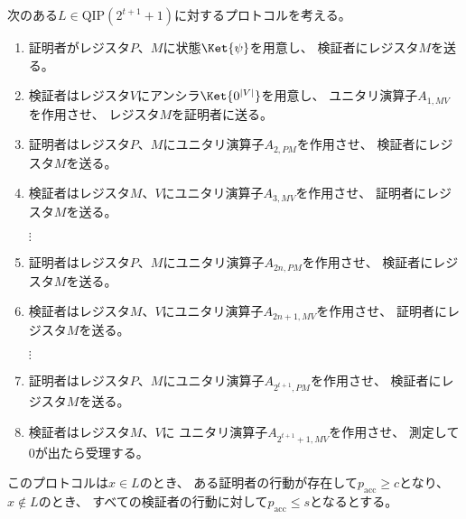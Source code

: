 \documentclass[a4paper, 10pt]{jsarticle}
\begin{document}
次のある$L \in \mathrm{QIP}(2^{t+1} + 1)$に対するプロトコルを考える。
\begin{enumerate}
	\item 証明者がレジスタ$P$、$M$に状態$\Ket{\psi}$を用意し、
	検証者にレジスタ$M$を送る。
	\item 検証者はレジスタ$V$にアンシラ$\Ket{0^{|V|}}$を用意し、
	ユニタリ演算子$A_{1, MV}$を作用させ、
	レジスタ$M$を証明者に送る。
	\item 証明者はレジスタ$P$、$M$にユニタリ演算子$A_{2, PM}$を作用させ、
	検証者にレジスタ$M$を送る。
	\item 検証者はレジスタ$M$、$V$にユニタリ演算子$A_{3, MV}$を作用させ、
	証明者にレジスタ$M$を送る。

	\begin{center}
		$\vdots$
	\end{center}

	\item 証明者はレジスタ$P$、$M$にユニタリ演算子$A_{2n, PM}$を作用させ、
	検証者にレジスタ$M$を送る。
	\item 検証者はレジスタ$M$、$V$にユニタリ演算子$A_{2n+1, MV}$を作用させ、
	証明者にレジスタ$M$を送る。

	\begin{center}
		$\vdots$
	\end{center}

	\item 証明者はレジスタ$P$、$M$にユニタリ演算子$A_{2^{t+1}, PM}$を作用させ、
	検証者にレジスタ$M$を送る。
	\item 検証者はレジスタ$M$、$V$に
	ユニタリ演算子$A_{2^{t+1}+1, MV}$を作用させ、
	測定して$0$が出たら受理する。
\end{enumerate}
このプロトコルは$x \in L$のとき、
ある証明者の行動が存在して$p_\mathrm{acc} \geq c$となり、
$x \notin L$のとき、
すべての検証者の行動に対して$p_\mathrm{acc} \leq s$となるとする。
\end{document}
